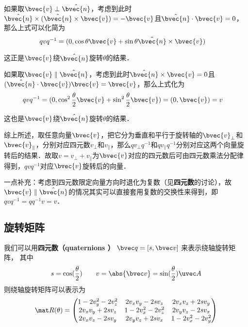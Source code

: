 如果取$\bvec{v}\perp\hat{\bvec{n}}$，考虑到此时$\hat{\bvec{n}}\times(\hat{\bvec{n}}\times\bvec{v})=-\bvec{v}$且$\hat{\bvec{n}}\cdot\bvec{v}=0$，那么上式可以化简为
\begin{equation}
\begin{aligned}
qvq^{-1}&=(0, \cos\theta\bvec{v}+\sin\theta\hat{\bvec{n}}\times\bvec{v})
\end{aligned}
\end{equation}

这正是$\bvec{v}$绕$\hat{\bvec{n}}$旋转$\theta$的结果．

如果取$\bvec{v}\parallel\hat{\bvec{n}}$，考虑到此时$\hat{\bvec{n}}\times\bvec{v}=0$且$(\hat{\bvec{n}}\cdot\bvec{v})\bvec{v}=\bvec{v}$，那么上式化为
\begin{equation}
\begin{aligned}
qvq^{-1}&=(0, \cos^2\frac{\theta}{2}\bvec{v}+\sin^2\frac{\theta}{2}\bvec{v})=(0, \bvec{v})=v
\end{aligned}
\end{equation}

这也是$\bvec{v}$绕$\hat{\bvec{n}}$旋转$\theta$的结果．

综上所述，取任意向量$\bvec{v}$，把它分为垂直和平行于旋转轴的$\bvec{v}_\perp$和$\bvec{v}_\parallel$，分别对应四元数$v_\perp$和$v_\parallel$，那么$q v_\perp q^{-1}$和$q v_\parallel q^{-1}$分别对应这两个向量旋转后的结果．故取$v=v_\perp+v_\parallel$为$\bvec{v}$对应的四元数后可由四元数乘法分配律得到，$qvq^{-1}$对应$\bvec{v}$旋转后的向量．

一点补充：考虑到四元数限定向量方向时退化为复数（见\textbf{四元数}的讨论），故$\bvec{v}\parallel\hat{\bvec{n}}$的情况其实可以直接套用复数的交换性来得到，即$qvq^{-1}=qq^{-1}v=v$．






\subsection{旋转矩阵}
我们可以用\textbf{四元数（quaternions ）} $\bvec q = [s, \bvec v]$ 来表示绕轴旋转矩阵， 其中
\begin{equation}
s = \cos(\frac{\theta}{2}) \qquad v = \abs{\bvec v} = \sin(\frac{\theta}{2})\uvec A
\end{equation}
则绕轴旋转矩阵可以表示为
\begin{equation}\label{QuatN_eq2}
\mat R(\theta) =
\begin{pmatrix}
1 - 2v_y^2 - 2v_z^2 & 2v_xv_y - 2sv_z  & 2v_x v_z + 2s v_y\\
2v_x v_y + 2sv_z & 1 - 2v_x^2 - 2v_z^2 & 2v_y v_z - 2s v_x\\
2v_x v_z - 2s v_y & 2v_y v_z + 2s v_x & 1 - 2v_x^2 - 2v_y^2
\end{pmatrix}
\end{equation}

